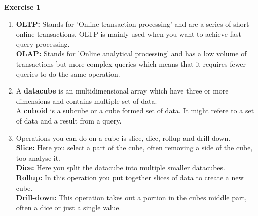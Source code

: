 {\bf \Huge Exercise 1}
\begin{enumerate}
	\item {\bf OLTP:} Stands for 'Online transaction processing' and are a series of short online transactions. OLTP is mainly used when you want to achieve fast query processing.\\
	{\bf OLAP:} Stands for 'Online analytical processing' and has a low volume of transactions but more complex queries which means that it requires fewer queries to do the same operation. 

	\item A {\bf datacube} is an multidimensional array which have three or more dimensions and contains multiple set of data.\\A {\bf cuboid} is a subcube or a cube formed set of data. It might refere to a set of data and a result from a query.

	\item Operations you can do on a cube is slice, dice, rollup and drill-down.\\
	{\bf Slice:} Here you select a part of the cube, often removing a side of the cube, too analyse it.\\
	{\bf Dice:} Here you split the datacube into multiple smaller datacubes.\\
	{\bf Rollup:} In this operation you put together slices of data to create a new cube.\\
	{\bf Drill-down:} This operation takes out a portion in the cubes middle part, often a dice or just a single value.\\
\end{enumerate}
